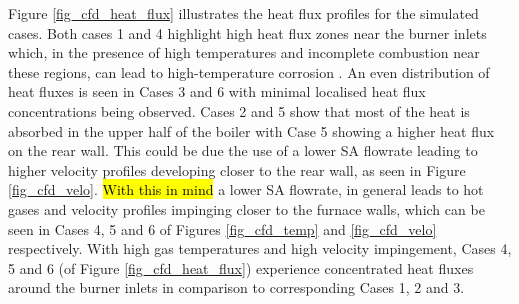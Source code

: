 \documentclass[twocolumn,10pt]{asme2ej}
\begin{document}
\newpage
Figure \ref{fig_cfd_heat_flux} illustrates the heat flux profiles for the simulated cases. Both cases 1 and 4 highlight high heat flux zones near the burner inlets which, in the presence of high temperatures and incomplete combustion near these regions, can lead to high-temperature corrosion \cite{ugum2019}. An even distribution of heat fluxes is seen in Cases 3 and 6 with minimal localised heat flux concentrations being observed. Cases 2 and 5 show that most of the heat is absorbed in the upper half of the boiler with Case 5 showing a higher heat flux on the rear wall. This could be due the use of a lower SA flowrate leading to higher velocity profiles developing closer to the rear wall, as seen in Figure \ref{fig_cfd_velo}. \hl{With this in mind} a lower SA flowrate, in general leads to hot gases and velocity profiles impinging closer to the furnace walls, which can be seen in Cases 4, 5 and 6 of Figures \ref{fig_cfd_temp} and \ref{fig_cfd_velo} respectively. With high gas temperatures and high velocity impingement, Cases 4, 5 and 6 (of Figure \ref{fig_cfd_heat_flux}) experience concentrated heat fluxes around the burner inlets in comparison to corresponding Cases 1, 2 and 3.\\
\end{document}
